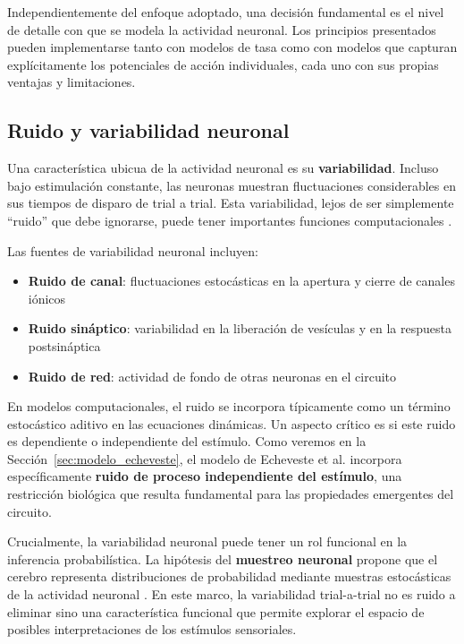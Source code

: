 Independientemente del enfoque adoptado, una decisión fundamental es el nivel de detalle con que se modela la actividad neuronal. Los principios presentados pueden implementarse tanto con modelos de tasa como con modelos que capturan explícitamente los potenciales de acción individuales, cada uno con sus propias ventajas y limitaciones.

\subsection{Ruido y variabilidad neuronal}
\label{subsec:ruido_neuronal}

Una característica ubicua de la actividad neuronal es su \textbf{variabilidad}. Incluso bajo estimulación constante, las neuronas muestran fluctuaciones considerables en sus tiempos de disparo de trial a trial. Esta variabilidad, lejos de ser simplemente ``ruido'' que debe ignorarse, puede tener importantes funciones computacionales \citep{gerstner2002spiking}.

Las fuentes de variabilidad neuronal incluyen:

\begin{itemize}
    \item \textbf{Ruido de canal}: fluctuaciones estocásticas en la apertura y cierre de canales iónicos
    \item \textbf{Ruido sináptico}: variabilidad en la liberación de vesículas y en la respuesta postsináptica
    \item \textbf{Ruido de red}: actividad de fondo de otras neuronas en el circuito
\end{itemize}

En modelos computacionales, el ruido se incorpora típicamente como un término estocástico aditivo en las ecuaciones dinámicas. Un aspecto crítico es si este ruido es dependiente o independiente del estímulo. Como veremos en la Sección~\ref{sec:modelo_echeveste}, el modelo de Echeveste et al. incorpora específicamente \textbf{ruido de proceso independiente del estímulo}, una restricción biológica que resulta fundamental para las propiedades emergentes del circuito.

Crucialmente, la variabilidad neuronal puede tener un rol funcional en la inferencia probabilística. La hipótesis del \textbf{muestreo neuronal} propone que el cerebro representa distribuciones de probabilidad mediante muestras estocásticas de la actividad neuronal \citep{echeveste2020cortical}. En este marco, la variabilidad trial-a-trial no es ruido a eliminar sino una característica funcional que permite explorar el espacio de posibles interpretaciones de los estímulos sensoriales.

